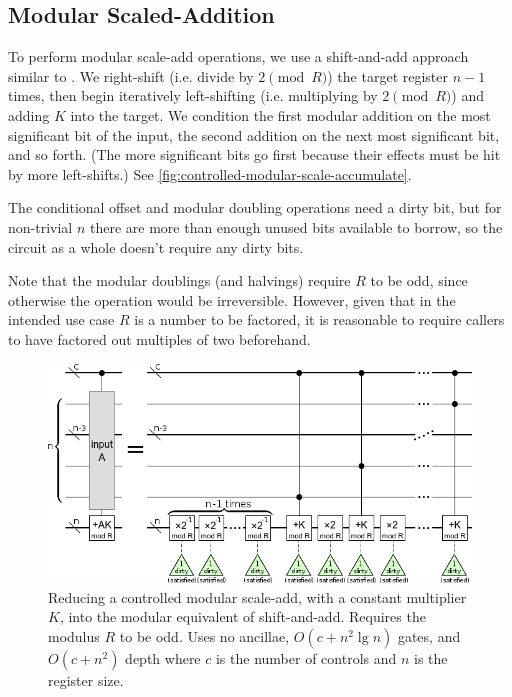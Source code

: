 \documentclass[twocolumn,longbibliography]{quantumarticle-customized}
\begin{document}
\subsection{Modular Scaled-Addition}

To perform modular scale-add operations, we use a shift-and-add approach similar to \cite{beauregard2003}.
We right-shift (i.e. divide by $2 {\pmod R}$) the target register $n-1$ times, then begin iteratively left-shifting (i.e. multiplying by $2 {\pmod R}$) and adding $K$ into the target.
We condition the first modular addition on the most significant bit of the input, the second addition on the next most significant bit, and so forth.
(The more significant bits go first because their effects must be hit by more left-shifts.)
See \autoref{fig:controlled-modular-scale-accumulate}.

The conditional offset and modular doubling operations need a dirty bit, but for non-trivial $n$ there are more than enough unused bits available to borrow, so the circuit as a whole doesn't require any dirty bits.

Note that the modular doublings (and halvings) require $R$ to be odd, since otherwise the operation would be irreversible.
However, given that in the intended use case $R$ is a number to be factored, it is reasonable to require callers to have factored out multiples of two beforehand.

\begin{figure}
  \centering
  \includegraphics[width=\linewidth]{assets/controlled-modular-multiply-accumulate.png}
  \caption{
    Reducing a controlled modular scale-add, with a constant multiplier $K$, into the modular equivalent of shift-and-add.
    Requires the modulus $R$ to be odd.
    Uses no ancillae, $O(c + n^2 \lg n)$ gates, and $O(c + n^2)$ depth where $c$ is the number of controls and $n$ is the register size.
  }
  \label{fig:controlled-modular-scale-accumulate}
\end{figure}
\end{document}
